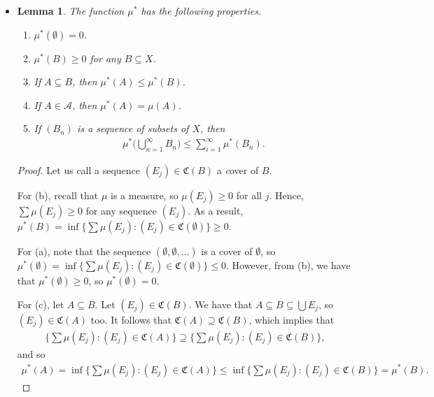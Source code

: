 \documentclass[10pt]{article}
\newtheorem{lemma}{Lemma}
\newcommand{\mcal}[1]{\mathcal{#1}}
\begin{document}
\begin{itemize}
  \item \begin{lemma} \label{lemma:mu-prime-property}
    The function $\mu^*$ has the following properties.
    \begin{enumerate}
      \item[(a)] $\mu^*(\emptyset) = 0$.
      \item[(b)] $\mu^*(B) \geq 0$ for any $B \subseteq X$.
      \item[(c)] If $A \subseteq B$, then $\mu^*(A) \leq \mu^*(B)$.
      \item[(d)] If $A \in \mcal{A}$, then $\mu^*(A) = \mu(A)$.
      \item[(e)] If $(B_n)$ is a sequence of subsets of $X$, then
      \begin{align*}
        \mu^*\bigg( \bigcup_{n=1}^\infty B_n \bigg) \leq \sum_{i=1}^\infty \mu^*(B_n).
      \end{align*}
    \end{enumerate}
  \end{lemma}

  \begin{proof}
    Let us call a sequence $(E_j) \in \mathfrak{C}(B)$ a {\emph cover} of $B$.

    For (b), recall that $\mu$ is a measure, so $\mu(E_j) \geq 0$ for all $j$. Hence, $\sum \mu(E_j) \geq 0$ for any sequence $(E_j)$. As a result, $\mu^*(B) = \inf\{ \sum \mu(E_j) : (E_j) \in \mathfrak{C}(\emptyset) \} \geq 0$.

    For (a), note that the sequence $(\emptyset, \emptyset, \dotsc)$ is a cover of $\emptyset$, so $\mu^*(\emptyset) = \inf\{ \sum \mu(E_j) : (E_j) \in \mathfrak{C}(\emptyset) \} \leq 0.$ However, from (b), we have that $\mu^*(\emptyset) \geq 0$, so $\mu^*(\emptyset) = 0$.

    For (c), let $A \subseteq B$. Let $(E_j) \in \mathfrak{C}(B)$. We have that $A \subseteq B \subseteq \bigcup E_j$, so $(E_j) \in \mathfrak{C}(A)$ too. It follows that $\mathfrak{C}(A) \supseteq \mathfrak{C}(B)$, which implies that
    \begin{align*}
      \bigg\{ \sum \mu(E_j) : (E_j) \in \mathfrak{C}(A) \bigg\} \supseteq \bigg\{ \sum \mu(E_j) : (E_j) \in \mathfrak{C}(B) \bigg\},
    \end{align*}
    and so
    \begin{align*}
      \mu^*(A) = \inf\bigg\{ \sum \mu(E_j) : (E_j) \in \mathfrak{C}(A) \bigg\} \leq \inf\bigg\{ \sum \mu(E_j) : (E_j) \in \mathfrak{C}(B) \bigg\} = \mu^*(B).
    \end{align*}


\end{proof}
\end{itemize}
\end{document}
